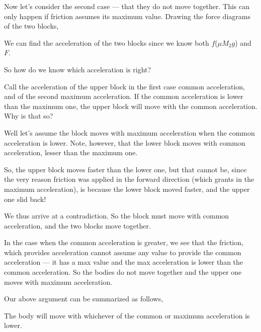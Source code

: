 Now let's consider the second case --- that they do not move together. This can only happen 
if friction assumes its maximum value. Drawing the force diagrams of the two blocks,

\begin{marginfigure}
\end{marginfigure}

We can find the acceleration of the two blocks since we know both \(f\)(\(\mu M_2g\)) 
and \(F\).

So how do we know which acceleration is right?

Call the acceleration of the upper block in the first case common acceleration, and of the second maximum acceleration.
If the common acceleration is lower than the maximum one, the upper block will move 
with the common acceleration. Why is that so?

Well let's assume the block moves with maximum acceleration when the common acceleration is lower.
Note, however, that the lower block moves with common acceleration, lesser than the maximum one.

So, the upper block moves faster than the lower one, but that cannot be, since the very reason 
friction was applied in the forward direction (which grants in the maximum acceleration),
is because the lower block moved faster, and the upper one slid back!

We thus arrive at a contradiction. So the block must move with common acceleration, and 
the two blocks move together.

In the case when the common acceleration is greater, we see that the friction, which provides 
acceleration cannot assume any value to provide the common acceleration --- it has a max value 
and the max acceleration is lower than the common acceleration. So the bodies do not move together 
and the upper one moves with maximum acceleration.

Our above argument can be summarized as follows,

\begin{mdframed}
    The body will move with whichever of the common or maximum acceleration is lower.
\end{mdframed}

